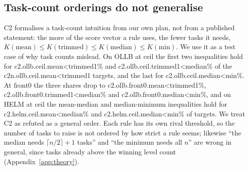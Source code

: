 \subsection{Task-count orderings do not generalise}\label{sec:order}
C2 formalises a task-count intuition from our own plan, not from a published statement: the more of the score vector a rule uses, the fewer tasks it needs, $K(\text{mean})\le K(\text{trimmed})\le K(\text{median})\le K(\text{min})$. We use it as a test case of why task counts mislead. On OLLB at \textsf{ceil} the first two inequalities hold for \num{c2.ollb.ceil.mean<trimmed1}\% and \num{c2.ollb.ceil.trimmed1<median}\% of the \num{c2n.ollb.ceil.mean<trimmed1} targets, and the last for \num{c2.ollb.ceil.median<min}\%. At \textsf{front0} the three shares drop to \num{c2.ollb.front0.mean<trimmed1}\%, \num{c2.ollb.front0.trimmed1<median}\% and \num{c2.ollb.front0.median<min}\%, and on HELM at \textsf{ceil} the mean-median and median-minimum inequalities hold for \num{c2.helm.ceil.mean<median}\% and \num{c2.helm.ceil.median<min}\% of targets. We treat C2 as refuted as a general order. Each rule has its own rival threshold, so the number of tasks to raise is not ordered by how strict a rule seems; likewise ``the median needs $\lceil n/2\rceil+1$ tasks'' and ``the minimum needs all $n$'' are wrong in general, since tasks already above the winning level count (Appendix~\ref{app:theory}).

